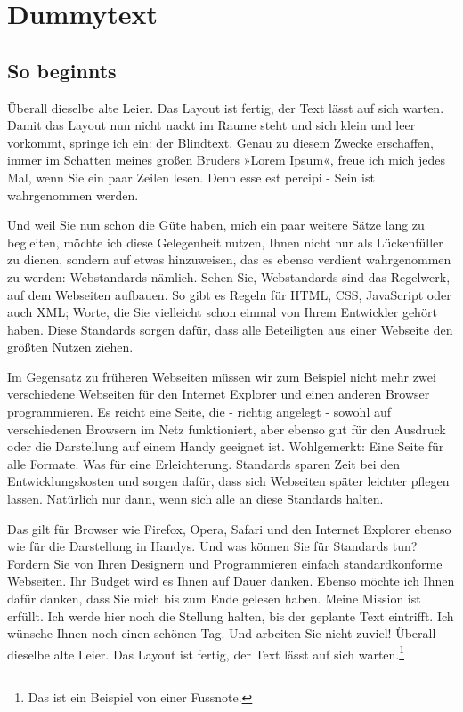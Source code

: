 \chapter{Dummytext}

\section{So beginnts}
Überall dieselbe alte Leier. Das Layout ist fertig, der Text lässt auf sich warten. Damit das Layout nun nicht nackt im Raume steht und sich klein und leer vorkommt, springe ich ein: der Blindtext. Genau zu diesem Zwecke erschaffen, immer im Schatten meines großen Bruders »Lorem Ipsum«, freue ich mich jedes Mal, wenn Sie ein paar Zeilen lesen. Denn esse est percipi \parencite{Mahlberg.1993} - Sein ist wahrgenommen werden.

Und weil Sie nun schon die Güte haben, mich ein paar weitere Sätze lang zu begleiten, möchte ich diese Gelegenheit nutzen, Ihnen nicht nur als Lückenfüller zu dienen, sondern auf etwas hinzuweisen, das es ebenso verdient wahrgenommen zu werden: Webstandards nämlich. Sehen Sie, Webstandards sind das Regelwerk, auf dem Webseiten aufbauen. So gibt es Regeln für HTML, CSS, JavaScript oder auch XML; Worte, die Sie vielleicht schon einmal von Ihrem Entwickler gehört haben. Diese Standards sorgen dafür, dass alle Beteiligten aus einer Webseite den größten Nutzen ziehen.

Im Gegensatz zu früheren Webseiten müssen wir zum Beispiel nicht mehr zwei verschiedene Webseiten für den Internet Explorer und einen anderen Browser programmieren. Es reicht eine Seite, die - richtig angelegt - sowohl auf verschiedenen Browsern im Netz funktioniert, aber ebenso gut für den Ausdruck oder die Darstellung auf einem Handy geeignet ist. Wohlgemerkt: Eine Seite für alle Formate. Was für eine Erleichterung. Standards sparen Zeit bei den Entwicklungskosten und sorgen dafür, dass sich Webseiten später leichter pflegen lassen. Natürlich nur dann, wenn sich alle an diese Standards halten.

Das gilt für Browser wie Firefox, Opera, Safari und den Internet Explorer ebenso wie für die Darstellung in Handys. Und was können Sie für Standards tun? Fordern Sie von Ihren Designern und Programmieren einfach standardkonforme Webseiten. Ihr Budget wird es Ihnen auf Dauer danken. Ebenso möchte ich Ihnen dafür danken, dass Sie mich bis zum Ende gelesen haben. Meine Mission ist erfüllt. Ich werde hier noch die Stellung halten, bis der geplante Text eintrifft. Ich wünsche Ihnen noch einen schönen Tag. Und arbeiten Sie nicht zuviel! Überall dieselbe alte Leier. Das Layout ist fertig, der Text lässt auf sich warten.\footnote{Das ist ein Beispiel von einer Fussnote.}

